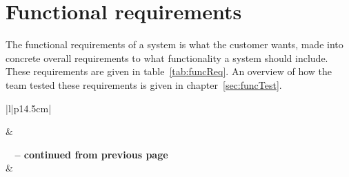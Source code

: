 \newpage
\section{Functional requirements}
The functional requirements of a system is what the customer wants, made into concrete overall requirements to what functionality a system should include. These requirements are given in table~\ref{tab:funcReq}.
An overview of how the team tested these requirements is given in chapter~\ref{sec:funcTest}.

\begin{longtable}{|l|p{14.5cm}|}

\hline
{} &  \\
\endfirsthead


%
{{\bfseries \tablename\ \thetable{} -- continued from previous page}} \\\hline
{} &  \\
\endhead

 \\ \hline
\endfoot
 
\endlastfoot


\end{longtable}
